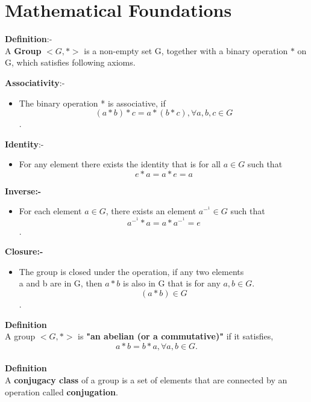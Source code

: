 \documentclass[12pt]{article}
\begin{document}
	    \section{Mathematical Foundations}
		    \item \textbf{Definition}:-\\
		    A \textbf{Group} $<G,*>$ is a non-empty set G, together with a binary operation $*$ on G, which satisfies following axioms.\\
		        \item \textbf{Associativity}:-
		    \begin{itemize}
		        \item The binary operation * is associative, if 
		        $$(a*b)*c = a*(b*c), \forall a,b,c \in G$$.
		    \end{itemize}
		    \item \textbf{Identity}:-
		    \begin{itemize}
		        \item For any element there exists the identity that is for all $a\in G$ such that\\
		        $$e*a = a*e = a$$
		        \end{itemize}
		        \item \textbf{Inverse:-}
             \begin{itemize}
		            \item For each element $a \in G$, there exists an element $a^-^1 \in G$ such that\\
		            $$a^-^1*a = a*a^-^1 = e$$.
		            \end{itemize}
		            \item \textbf{Closure:-}
		            \begin{itemize}
		                \item The group is closed under the operation, if any two elements\\
		                a and b are in G, then $a* b$ is also in G  that is for any $a,b \in G$.\\
		                $$(a*b)\in G$$.
		            \end{itemize}
		            \textbf{Definition}\\
        A group $<G,*>$ is \textbf{"an abelian (or a commutative)"} if it satisfies,
        $$a*b = b*a, \forall a,b\in G.$$\\
        \textbf{Definition}\\
       A \textbf{conjugacy class} of a group is a set of elements that are connected by an operation called \textbf{conjugation}.\\
\end{document}
